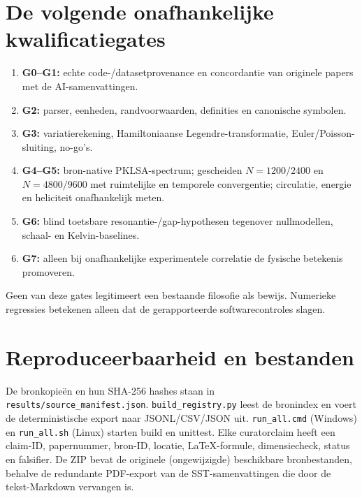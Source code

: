 \documentclass[10pt,a4paper]{article}
\newcommand{\code}[1]{\texttt{#1}}
\begin{document}
\section{De volgende onafhankelijke kwalificatiegates}
\begin{enumerate}\setlength\itemsep{2pt}
\item \textbf{G0--G1:} echte code-/datasetprovenance en concordantie van originele papers met de AI-samenvattingen.
\item \textbf{G2:} parser, eenheden, randvoorwaarden, definities en canonische symbolen.
\item \textbf{G3:} variatierekening, Hamiltoniaanse Legendre-transformatie, Euler/Poisson-sluiting, no-go's.
\item \textbf{G4--G5:} bron-native PKLSA-spectrum; gescheiden \(N=1200/2400\) en \(N=4800/9600\) met ruimtelijke en temporele convergentie; circulatie, energie en heliciteit onafhankelijk meten.
\item \textbf{G6:} blind toetsbare resonantie-/gap-hypothesen tegenover nullmodellen, schaal- en Kelvin-baselines.
\item \textbf{G7:} alleen bij onafhankelijke experimentele correlatie de fysische betekenis promoveren.
\end{enumerate}
Geen van deze gates legitimeert een bestaande filosofie als bewijs. Numerieke regressies betekenen alleen dat de gerapporteerde softwarecontroles slagen.

\section*{Reproduceerbaarheid en bestanden}
De bronkopie\"en en hun SHA-256 hashes staan in \code{results/source\_manifest.json}. \code{build\_registry.py} leest de bronindex en voert de deterministische export naar JSONL/CSV/JSON uit. \code{run\_all.cmd} (Windows) en \code{run\_all.sh} (Linux) starten build en unittest. Elke curatorclaim heeft een claim-ID, papernummer, bron-ID, locatie, LaTeX-formule, dimensiecheck, status en falsifier. De ZIP bevat de originele (ongewijzigde) beschikbare bronbestanden, behalve de redundante PDF-export van de SST-samenvattingen die door de tekst-Markdown vervangen is.
\end{document}
